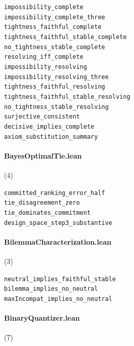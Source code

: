 {\footnotesize
\texttt{impossibility\_complete}\\
\texttt{impossibility\_complete\_three}\\
\texttt{tightness\_faithful\_complete}\\
\texttt{tightness\_faithful\_stable\_complete}\\
\texttt{no\_tightness\_stable\_complete}\\
\texttt{resolving\_iff\_complete}\\
\texttt{impossibility\_resolving}\\
\texttt{impossibility\_resolving\_three}\\
\texttt{tightness\_faithful\_resolving}\\
\texttt{tightness\_faithful\_stable\_resolving}\\
\texttt{no\_tightness\_stable\_resolving}\\
\texttt{surjective\_consistent}\\
\texttt{decisive\_implies\_complete}\\
\texttt{axiom\_substitution\_summary}\\
}

\paragraph{BayesOptimalTie.lean} (4)

{\footnotesize
\texttt{committed\_ranking\_error\_half}\\
\texttt{tie\_disagreement\_zero}\\
\texttt{tie\_dominates\_commitment}\\
\texttt{design\_space\_step3\_substantive}\\
}

\paragraph{BilemmaCharacterization.lean} (3)

{\footnotesize
\texttt{neutral\_implies\_faithful\_stable}\\
\texttt{bilemma\_implies\_no\_neutral}\\
\texttt{maxIncompat\_implies\_no\_neutral}\\
}

\paragraph{BinaryQuantizer.lean} (7)

